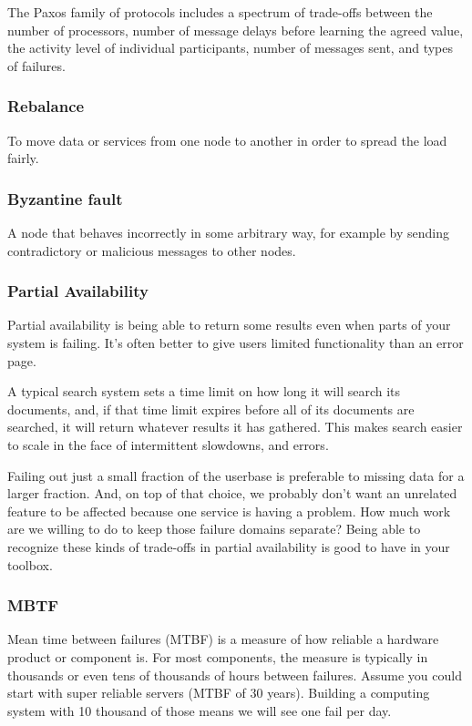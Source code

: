 \documentclass{article}
\begin{document}
    The Paxos family of protocols includes a spectrum of trade-offs between the number of processors, number of message delays before learning the agreed value, the activity level of individual participants, number of messages sent, and types of failures.
    
    \subsubsection{Rebalance}
    To move data or services from one node to another in order to spread the load fairly.
    
    \subsubsection{Byzantine fault}
    A node that behaves incorrectly in some arbitrary way, for example by sending contradictory or malicious messages to other nodes.
    
    \subsubsection{Partial Availability}
    Partial availability is being able to return some results even when parts of your system is failing. It's often better to give users limited functionality than an error page.
    
    A typical search system sets a time limit on how long it will search its documents, and, if that time limit expires before all of its documents are searched, it will return whatever results it has gathered. This makes search easier to scale in the face of intermittent slowdowns, and errors.
     
    Failing out just a small fraction of the userbase is preferable to missing data for a larger fraction. And, on top of that choice, we probably don’t want an unrelated feature to be affected because one service is having a problem. How much work are we willing to do to keep those failure domains separate? Being able to recognize these kinds of trade-offs in partial availability is good to have in your toolbox.

    \subsubsection{MBTF}
    Mean time between failures (MTBF)  is a measure of how reliable a hardware product or component is. For most components, the measure is typically in thousands or even tens of thousands of hours between failures.
    Assume you could start with super reliable servers (MTBF of 30 years). Building a computing system with 10 thousand of those means we will see one fail per day.
\end{document}
